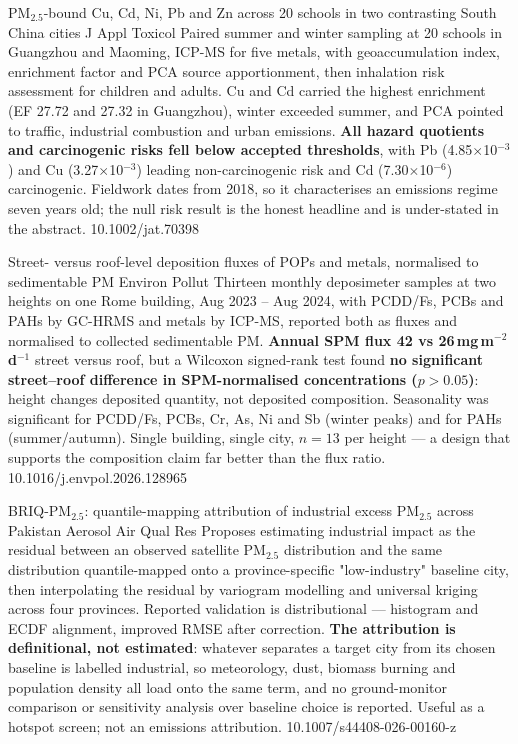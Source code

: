 \documentclass[10pt]{article}
\begin{document}

{PM$_{2.5}$-bound Cu, Cd, Ni, Pb and Zn across 20 schools in two contrasting South China cities}
{J Appl Toxicol}
{Paired summer and winter sampling at 20 schools in Guangzhou and Maoming, ICP-MS for five
metals, with geoaccumulation index, enrichment factor and PCA source apportionment, then
inhalation risk assessment for children and adults. Cu and Cd carried the highest enrichment
(EF 27.72 and 27.32 in Guangzhou), winter exceeded summer, and PCA pointed to traffic,
industrial combustion and urban emissions. \textbf{All hazard quotients and carcinogenic
risks fell below accepted thresholds}, with Pb (4.85$\times$10$^{-3}$) and Cu
(3.27$\times$10$^{-3}$) leading non-carcinogenic risk and Cd (7.30$\times$10$^{-6}$)
carcinogenic. Fieldwork dates from 2018, so it characterises an emissions regime seven years
old; the null risk result is the honest headline and is under-stated in the abstract.}
{10.1002/jat.70398}

{Street- versus roof-level deposition fluxes of POPs and metals, normalised to sedimentable PM}
{Environ Pollut}
{Thirteen monthly deposimeter samples at two heights on one Rome building, Aug 2023 --
Aug 2024, with PCDD/Fs, PCBs and PAHs by GC-HRMS and metals by ICP-MS, reported both as
fluxes and normalised to collected sedimentable PM. \textbf{Annual SPM flux 42 vs
26\,mg\,m$^{-2}$\,d$^{-1}$} street versus roof, but a Wilcoxon signed-rank test found
\textbf{no significant street--roof difference in SPM-normalised concentrations
($p>0.05$)}: height changes deposited quantity, not deposited composition. Seasonality was
significant for PCDD/Fs, PCBs, Cr, As, Ni and Sb (winter peaks) and for PAHs
(summer/autumn). Single building, single city, $n=13$ per height --- a design that supports
the composition claim far better than the flux ratio.}
{10.1016/j.envpol.2026.128965}

{BRIQ-PM$_{2.5}$: quantile-mapping attribution of industrial excess PM$_{2.5}$ across Pakistan}
{Aerosol Air Qual Res}
{Proposes estimating industrial impact as the residual between an observed satellite
PM$_{2.5}$ distribution and the same distribution quantile-mapped onto a province-specific
"low-industry" baseline city, then interpolating the residual by variogram modelling and
universal kriging across four provinces. Reported validation is distributional --- histogram
and ECDF alignment, improved RMSE after correction. \textbf{The attribution is definitional,
not estimated}: whatever separates a target city from its chosen baseline is labelled
industrial, so meteorology, dust, biomass burning and population density all load onto the
same term, and no ground-monitor comparison or sensitivity analysis over baseline choice is
reported. Useful as a hotspot screen; not an emissions attribution.}
{10.1007/s44408-026-00160-z}
\end{document}
